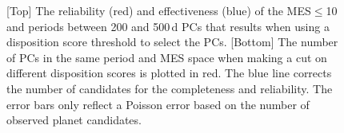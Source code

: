 \begin{figure}[h!]
\begin{center}
  \caption{\label{f:adjscore}[Top] The reliability (red) and effectiveness (blue) of the MES$\leq$10 and periods between 200 and 500\,d PCs that results when using a disposition score threshold to select the PCs.  [Bottom] The number of PCs in the same period and MES space when making a cut on different disposition scores is plotted in red.  The blue line corrects the number of candidates for the completeness and reliability. The error bars only reflect a Poisson error based on the number of observed planet candidates.}
 \end{center}
 \end{figure}


